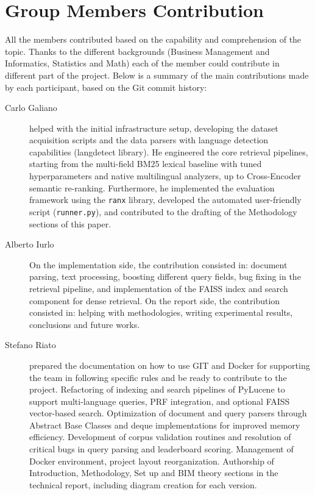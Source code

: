 \section{Group Members Contribution}

All the members contributed based on the capability and comprehension of the topic. Thanks to the different backgrounds (Business Management and Informatics, Statistics and Math) each of the member could contribute in different part of the project.
Below is a summary of the main contributions made by each participant, based on the Git commit history:

\begin{description}
	\item[Carlo Galiano] helped with the initial infrastructure setup, developing the dataset acquisition scripts and the data parsers with language detection capabilities (langdetect library). He engineered the core retrieval pipelines, starting from the multi-field BM25 lexical baseline with tuned hyperparameters and native multilingual analyzers, up to Cross-Encoder semantic re-ranking. Furthermore, he implemented the evaluation framework using the \texttt{ranx} library, developed the automated user-friendly script (\texttt{runner.py}), and contributed to the drafting of the Methodology sections of this paper.
	\item[Alberto Iurlo] On the implementation side, the contribution consisted in: document parsing, text processing, boosting different query fields, bug fixing in the retrieval pipeline, and implementation of the FAISS index and search component for dense retrieval. On the report side, the contribution consisted in: helping with methodologies, writing experimental results, conclusions and future works.
	\item[Stefano Riato] prepared the documentation on how to use GIT and Docker for supporting the team in following specific rules and be ready to contribute to the project. Refactoring of indexing and search pipelines of PyLucene to support multi-language queries, PRF integration, and optional FAISS vector-based search. Optimization of document and query parsers through Abstract Base Classes and deque implementations for improved memory efficiency. Development of corpus validation routines and resolution of critical bugs in query parsing and leaderboard scoring. Management of Docker environment, project layout reorganization. Authorship of Introduction, Methodology, Set up and BIM theory sections in the technical report, including diagram creation for each version.

\end{description}